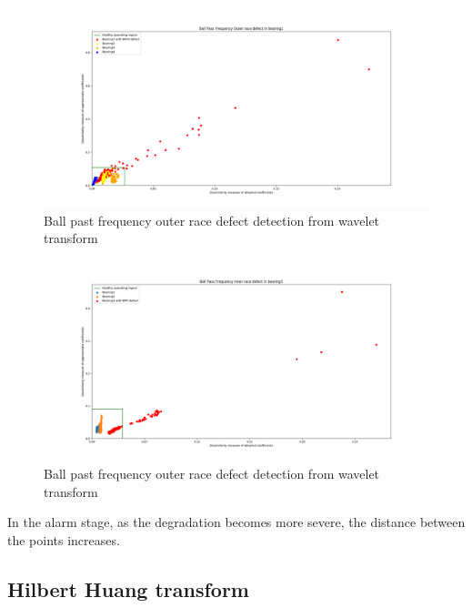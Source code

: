 \documentclass[11pt, oneside]{article}   	%
\begin{document}
\begin{flushleft}
\begin{figure}[H] %
   \centering
   \includegraphics[width=6in]{mixed_method_bpfo.png} 
   \caption{Ball past frequency outer race defect detection from wavelet transform}
   \label{fig:wo}
\end{figure}
\begin{figure}[H] %
   \centering
   \includegraphics[width=6in]{mixed_method_bpfi.png} 
   \caption{Ball past frequency outer race defect detection from wavelet transform}
   \label{fig:wi}
\end{figure}
In the alarm stage, as the degradation becomes more severe, the distance between the points increases.
\end{flushleft}




\subsection{Hilbert Huang transform}
\end{document}
